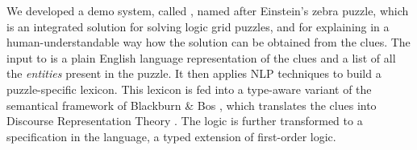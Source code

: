 We developed a demo system, called \ourtool, named after Einstein's zebra puzzle, which is an integrated solution for solving logic grid puzzles, and for explaining in a human-understandable way how the solution can be obtained from the clues. 
The input to \ourtool is a plain English language representation of the clues and a list of all the \textit{entities} present in the puzzle. It then applies NLP techniques to build a puzzle-specific lexicon. This lexicon is fed into a type-aware variant of the semantical framework of Blackburn \& Bos \cite{Blackburn2005,Blackburn2006}, which translates the clues into Discourse Representation Theory \cite{DRT}. The logic is further transformed to a specification in the \idp language, a typed extension of first-order logic. 

